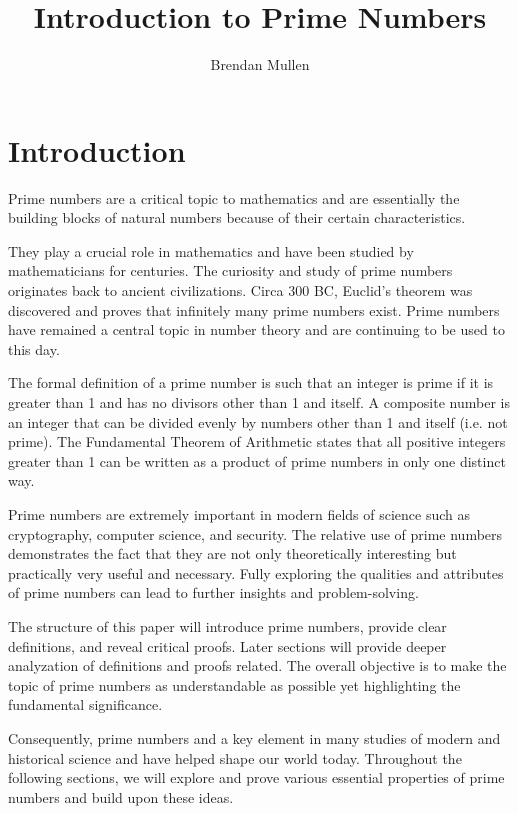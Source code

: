 \documentclass{article}
\title{Introduction to Prime Numbers}
\author{Brendan Mullen}\date{}
\theoremstyle{plain}
\theoremstyle{definition}
\theoremstyle{remark}
\begin{document}
\maketitle



\section*{Introduction}

\par Prime numbers are a critical topic to mathematics and are essentially the building blocks of natural numbers because of their certain characteristics. 

They play a crucial role in mathematics and have been studied by mathematicians for centuries. The curiosity and study of prime numbers originates back to ancient civilizations. Circa 300 BC, Euclid's theorem was discovered and proves that infinitely many prime numbers exist. Prime numbers have remained a central topic in number theory and are continuing to be used to this day.

The formal definition of a prime number is such that an integer is prime if it is greater than 1 and has no divisors other than 1 and itself. A composite number is an integer that can be divided evenly by numbers other than 1 and itself (i.e. not prime). The Fundamental Theorem of Arithmetic states that all positive integers greater than 1 can be written as a product of prime numbers in only one distinct way.

Prime numbers are extremely important in modern fields of science such as cryptography, computer science, and security. The relative use of prime numbers demonstrates the fact that they are not only theoretically interesting but practically very useful and necessary. Fully exploring the qualities and attributes of prime numbers can lead to further insights and problem-solving.

The structure of this paper will introduce prime numbers, provide clear definitions, and reveal critical proofs. Later sections will provide deeper analyzation of definitions and proofs related. The overall objective is to make the topic of prime numbers as understandable as possible yet highlighting the fundamental significance.

Consequently, prime numbers and a key element in many studies of modern and historical science and have helped shape our world today. Throughout the following sections, we will explore and prove various essential properties of prime numbers and build upon these ideas.
\end{document}
